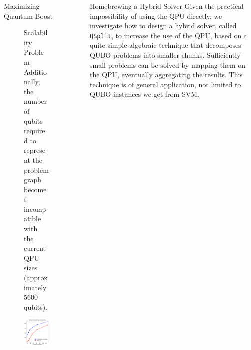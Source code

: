 \documentclass[final]{beamer}
\newlength{\sepwidth}
\newlength{\colwidth}
\newcommand{\separatorcolumn}{\begin{column}{\sepwidth}\end{column}}
\begin{document}
\begin{frame}[t,fragile]
\begin{columns}[t]
\begin{column}{\colwidth}
\begin{block}{Maximizing Quantum Boost}
\begin{figure}[h!]
\begin{minipage}{0.55\textwidth}
\begin{alertblock}{Scalability Problem}
          Additionally, the number of qubits required to represent the problem graph becomes incompatible with the current QPU sizes (approximately 5600 qubits).
        \end{alertblock}
      \end{minipage}%
      \hfill
      \begin{minipage}{0.4\textwidth}
          \centering
          \includegraphics[height=0.15\textheight]{logos/embedding_search_time.png}
      \end{minipage}
    \end{figure}
  \end{block}
\end{column}

\separatorcolumn

\begin{column}{\colwidth}
  \begin{block}{Homebrewing a Hybrid Solver}
    Given the practical impossibility of using the QPU directly, we investigate how to design a hybrid solver, called \texttt{QSplit}, to increase the use of the QPU, based on a quite simple algebraic technique that decomposes QUBO problems into smaller chunks. 
    Sufficiently small problems can be solved by mapping them on the QPU, eventually aggregating the results. This technique is of general application, not limited to QUBO instances we get from SVM.


\end{block}
\end{column}
\end{columns}
\end{frame}
\end{document}
